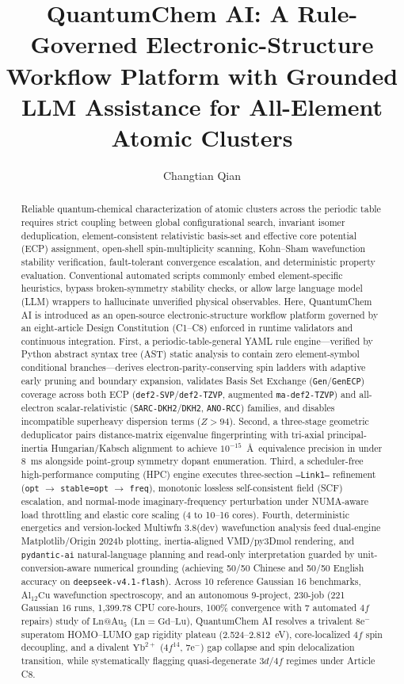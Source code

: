 \documentclass[journal=jctcce,manuscript=article]{achemso}
\author{Changtian Qian}
\affiliation[Capital Normal University]{Department of Physics, Capital Normal University, Beijing 100048, China}
\title[QuantumChem AI]{QuantumChem AI: A Rule-Governed Electronic-Structure Workflow Platform with Grounded LLM Assistance for All-Element Atomic Clusters}
\begin{document}
\sloppy

\begin{abstract}
Reliable quantum-chemical characterization of atomic clusters across the periodic table requires strict coupling between global configurational search, invariant isomer deduplication, element-consistent relativistic basis-set and effective core potential (ECP) assignment, open-shell spin-multiplicity scanning, Kohn--Sham wavefunction stability verification, fault-tolerant convergence escalation, and deterministic property evaluation. Conventional automated scripts commonly embed element-specific heuristics, bypass broken-symmetry stability checks, or allow large language model (LLM) wrappers to hallucinate unverified physical observables. Here, QuantumChem AI is introduced as an open-source electronic-structure workflow platform governed by an eight-article Design Constitution (C1--C8) enforced in runtime validators and continuous integration. First, a periodic-table-general YAML rule engine---verified by Python abstract syntax tree (AST) static analysis to contain zero element-symbol conditional branches---derives electron-parity-conserving spin ladders with adaptive early pruning and boundary expansion, validates Basis Set Exchange (\texttt{Gen}/\texttt{GenECP}) coverage across both ECP (\texttt{def2-SVP}/\texttt{def2-TZVP}, augmented \texttt{ma-def2-TZVP}) and all-electron scalar-relativistic (\texttt{SARC-DKH2}/\texttt{DKH2}, \texttt{ANO-RCC}) families, and disables incompatible superheavy dispersion terms ($Z > 94$). Second, a three-stage geometric deduplicator pairs distance-matrix eigenvalue fingerprinting with tri-axial principal-inertia Hungarian/Kabsch alignment to achieve $10^{-15}$~\AA\ equivalence precision in under 8~ms alongside point-group symmetry dopant enumeration. Third, a scheduler-free high-performance computing (HPC) engine executes three-section \texttt{--Link1--} refinement (\texttt{opt} $\rightarrow$ \texttt{stable=opt} $\rightarrow$ \texttt{freq}), monotonic lossless self-consistent field (SCF) escalation, and normal-mode imaginary-frequency perturbation under NUMA-aware load throttling and elastic core scaling (4 to 10--16 cores). Fourth, deterministic energetics and version-locked Multiwfn 3.8(dev) wavefunction analysis feed dual-engine Matplotlib/Origin 2024b plotting, inertia-aligned VMD/py3Dmol rendering, and \texttt{pydantic-ai} natural-language planning and read-only interpretation guarded by unit-conversion-aware numerical grounding (achieving 50/50 Chinese and 50/50 English accuracy on \texttt{deepseek-v4.1-flash}). Across 10 reference Gaussian 16 benchmarks, $\mathrm{Al_{12}Cu}$ wavefunction spectroscopy, and an autonomous 9-project, 230-job (221 Gaussian 16 runs, 1,399.78 CPU core-hours, 100\% convergence with 7 automated $4f$ repairs) study of $\mathrm{Ln@Au_5}$ ($\mathrm{Ln} = \mathrm{Gd\text{--}Lu}$), QuantumChem AI resolves a trivalent $8\mathrm{e}^-$ superatom HOMO--LUMO gap rigidity plateau (2.524--2.812~eV), core-localized $4f$ spin decoupling, and a divalent $\mathrm{Yb^{2+}}$ ($4f^{14}$, $7\mathrm{e}^-$) gap collapse and spin delocalization transition, while systematically flagging quasi-degenerate $3d$/$4f$ regimes under Article C8.
\end{abstract}
\end{document}
